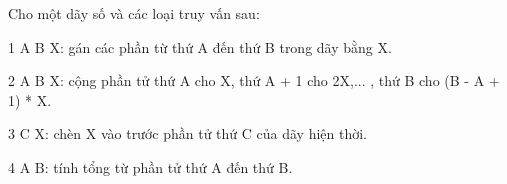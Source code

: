 Cho một dãy số và các loại truy vấn sau:  

   1 A B X: gán các phần từ thứ A đến thứ B trong dãy bằng X.  

   2 A B X: cộng phần tử thứ A cho X, thứ A + 1 cho 2X,... , thứ B cho (B - A + 1) * X.  

   3 C X: chèn X vào trước phần tử thứ C của dãy hiện thời.  

   4 A B: tính tổng từ phần tử thứ A đến thứ B.  

\